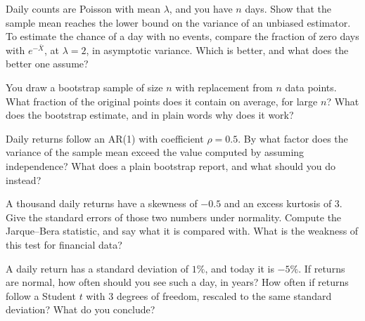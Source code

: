 \begin{question}\label{iq:iv1:statistics:17}
Daily counts are Poisson with mean $\lambda$, and you have $n$ days. Show that the sample mean reaches the lower bound on the variance of an unbiased estimator. To estimate the chance of a day with no events, compare the fraction of zero days with $e^{-\bar{X}}$, at $\lambda = 2$, in asymptotic variance. Which is better, and what does the better one assume?
\end{question}

\begin{question}\label{iq:iv1:statistics:18}
You draw a bootstrap sample of size $n$ with replacement from $n$ data points. What fraction of the original points does it contain on average, for large $n$? What does the bootstrap estimate, and in plain words why does it work?
\end{question}

\begin{question}\label{iq:iv1:statistics:19}
Daily returns follow an AR(1) with coefficient $\rho = 0.5$. By what factor does the variance of the sample mean exceed the value computed by assuming independence? What does a plain bootstrap report, and what should you do instead?
\end{question}

\begin{question}\label{iq:iv1:statistics:20}
A thousand daily returns have a skewness of $-0.5$ and an excess kurtosis of 3. Give the standard errors of those two numbers under normality. Compute the Jarque--Bera statistic, and say what it is compared with. What is the weakness of this test for financial data?
\end{question}

\begin{question}\label{iq:iv1:statistics:21}
A daily return has a standard deviation of $1\%$, and today it is $-5\%$. If returns are normal, how often should you see such a day, in years? How often if returns follow a Student $t$ with 3 degrees of freedom, rescaled to the same standard deviation? What do you conclude?
\end{question}

